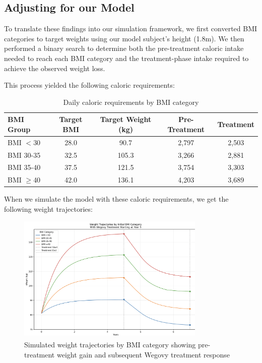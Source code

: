 \subsection{Adjusting for our Model}
To translate these findings into our simulation framework, we first converted BMI categories to target weights using our model subject's height (1.8m). We then performed a binary search to determine both the pre-treatment caloric intake needed to reach each BMI category and the treatment-phase intake required to achieve the observed weight loss.

This process yielded the following caloric requirements:

\begin{table}[!htb]
\centering
\begin{tabular}{|l|c|c|c|c|}
\hline
\textbf{BMI Group} & \textbf{Target BMI} & \textbf{Target Weight (kg)} & \textbf{Pre-Treatment} & \textbf{Treatment} \\
\hline
BMI $<$30 & 28.0 & 90.7 & 2,797 & 2,503 \\
BMI 30-35 & 32.5 & 105.3 & 3,266 & 2,881 \\
BMI 35-40 & 37.5 & 121.5 & 3,754 & 3,303 \\
BMI $\geq$40 & 42.0 & 136.1 & 4,203 & 3,689 \\
\hline
\end{tabular}
\caption{Daily caloric requirements by BMI category}
\end{table}

When we simulate the model with these caloric requirements, we get the following weight trajectories:

\begin{figure}[!htb]
\centering
\includegraphics[width=0.8\textwidth]{images/wegovy_weights_plot.png}
\caption{Simulated weight trajectories by BMI category showing pre-treatment weight gain and subsequent Wegovy treatment response}
\label{fig:wegovy_weights}
\end{figure}

